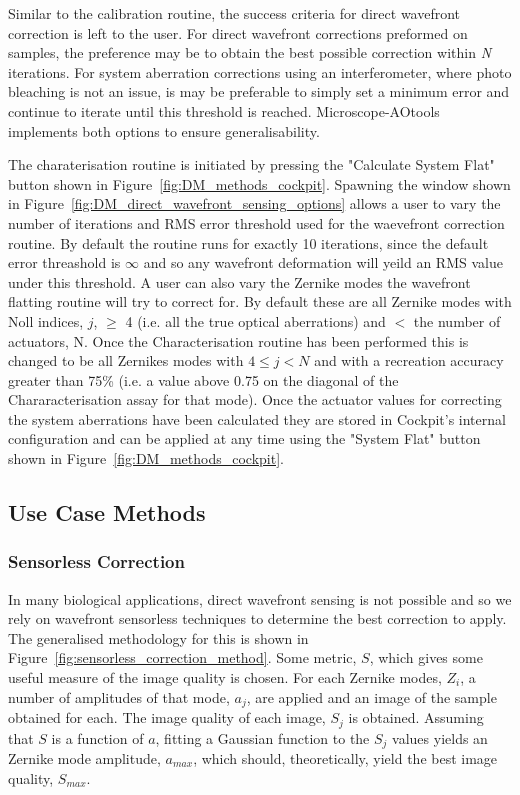 Similar to the calibration routine, the success criteria for direct wavefront correction is left to the user. For direct wavefront corrections preformed on samples, the preference may be to obtain the best possible correction within \textit{N} iterations. For system aberration corrections using an interferometer, where photo bleaching is not an issue, is may be preferable to simply set a minimum error and continue to iterate until this threshold is reached. Microscope-AOtools implements both options to ensure generalisability.

The charaterisation routine is initiated by pressing the "Calculate System Flat" button shown in Figure~\ref{fig:DM_methods_cockpit}. Spawning the window shown in Figure~\ref{fig:DM_direct_wavefront_sensing_options} allows a user to vary the number of iterations and RMS error threshold used for the waevefront correction routine. By default the routine runs for exactly 10 iterations, since the default error threashold is $\infty$ and so any wavefront deformation will yeild an RMS value under this threshold. A user can also vary the Zernike modes the wavefront flatting routine will try to correct for. By default these are all Zernike modes with Noll indices, $j$, $\ge$ 4 (i.e. all the true optical aberrations) and $<$ the number of actuators, N. Once the Characterisation routine has been performed this is changed to be all Zernikes modes with $4 \le j < N$ and with a recreation accuracy greater than 75\% (i.e. a value above 0.75 on the diagonal of the Chararacterisation assay for that mode). Once the actuator values for correcting the system aberrations have been calculated they are stored in Cockpit's internal configuration and can be applied at any time using the "System Flat" button shown in Figure~\ref{fig:DM_methods_cockpit}.

\subsection{Use Case Methods}
\label{subsec:use_case_methods}

\subsubsection{Sensorless Correction}
\label{subsubsec:sensorless_correction}

In many biological applications, direct wavefront sensing is not possible and so we rely on wavefront sensorless techniques to determine the best correction to apply. The generalised methodology for this is shown in Figure~\ref{fig:sensorless_correction_method}. Some metric, $S$, which gives some useful measure of the image quality is chosen. For each Zernike modes, $Z_{i}$, a number of amplitudes of that mode, $a_{j}$, are applied and an image of the sample obtained for each. The image quality of each image, $S_{j}$ is obtained. Assuming that $S$ is a function of $a$, fitting a Gaussian function to the $S_{j}$ values yields an Zernike mode amplitude, $a_{max}$, which should, theoretically, yield the best image quality, $S_{max}$. 

